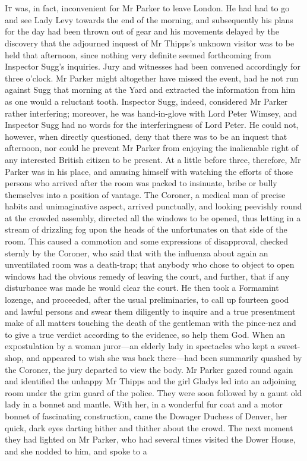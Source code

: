\chapter[Chapter \thechapter]{}
\lettrine[lines=4]{I}{t} was, in fact, inconvenient for Mr Parker to leave London. He had had to go and see Lady Levy towards the end of the morning, and subsequently his plans for the day had been thrown out of gear and his movements delayed by the discovery that the adjourned inquest of Mr Thipps’s unknown visitor was to be held that afternoon, since nothing very definite seemed forthcoming from Inspector Sugg’s inquiries. Jury and witnesses had been convened accordingly for three o’clock. Mr Parker might altogether have missed the event, had he not run against Sugg that morning at the Yard and extracted the information from him as one would a reluctant tooth. Inspector Sugg, indeed, considered Mr Parker rather interfering; moreover, he was hand-in-glove with Lord Peter Wimsey, and Inspector Sugg had no words for the interferingness of Lord Peter. He could not, however, when directly questioned, deny that there was to be an inquest that afternoon, nor could he prevent Mr Parker from enjoying the inalienable right of any interested British citizen to be present. At a little before three, therefore, Mr Parker was in his place, and amusing himself with watching the efforts of those persons who arrived after the room was packed to insinuate, bribe or bully themselves into a position of vantage. The Coroner, a medical man of precise habits and unimaginative aspect, arrived punctually, and looking peevishly round at the crowded assembly, directed all the windows to be opened, thus letting in a stream of drizzling fog upon the heads of the unfortunates on that side of the room. This caused a commotion and some expressions of disapproval, checked sternly by the Coroner, who said that with the influenza about again an unventilated room was a death-trap; that anybody who chose to object to open windows had the obvious remedy of leaving the court, and further, that if any disturbance was made he would clear the court. He then took a Formamint lozenge, and proceeded, after the usual preliminaries, to call up fourteen good and lawful persons and swear them diligently to inquire and a true presentment make of all matters touching the death of the gentleman with the pince-nez and to give a true verdict according to the evidence, so help them God. When an expostulation by a woman juror\allowbreak---\allowbreak an elderly lady in spectacles who kept a sweet-shop, and appeared to wish she was back there\allowbreak---\allowbreak had been summarily quashed by the Coroner, the jury departed to view the body. Mr Parker gazed round again and identified the unhappy Mr Thipps and the girl Gladys led into an adjoining room under the grim guard of the police. They were soon followed by a gaunt old lady in a bonnet and mantle. With her, in a wonderful fur coat and a motor bonnet of fascinating construction, came the Dowager Duchess of Denver, her quick, dark eyes darting hither and thither about the crowd. The next moment they had lighted on Mr Parker, who had several times visited the Dower House, and she nodded to him, and spoke to a 